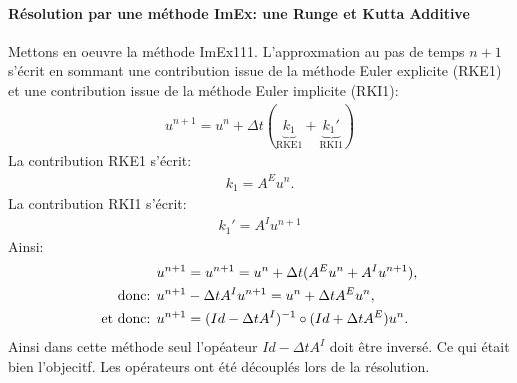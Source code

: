     \paragraph{Résolution par une méthode ImEx: une Runge et Kutta Additive}
            Mettons en oeuvre la méthode ImEx111. 
            L'approxmation au pas de temps $n+1$ s'écrit en sommant une contribution issue de la méthode Euler explicite (RKE1)
            et une contribution issue de la méthode Euler implicite (RKI1):
            \begin{align}
                u^{n+1} = u^n + \Delta t (\underbrace{k_1}_{\text{RKE1}} + \underbrace{k_1'}_{\text{RKI1}})
            \end{align}
            La contribution RKE1 s'écrit:
            \begin{align}
                k_1 = A^E u^n.
            \end{align}
            La contribution RKI1 s'écrit:
            \begin{align}
                k_1' = A^I u^{n+1}
            \end{align}
            Ainsi: 
            \begin{align}
                &u^{n+1} = u^{n+1} = u^n + \Delta t ( A^E u^n +  A^I u^{n+1}),\\\notag
                \text{donc: }&u^{n+1} - \Delta t  A^I u^{n+1} = u^n + \Delta t  A^E u^n,\\\notag
                \text{et donc: }&u^{n+1} = (Id - \Delta t A^I)^{-1} \circ (Id + \Delta t A^E) u^n.
            \end{align}
            Ainsi dans cette méthode seul l'opéateur $Id- \Delta t A^I$ doit être inversé. Ce qui était bien l'objecitf. Les opérateurs ont été 
            découplés lors de la résolution. 